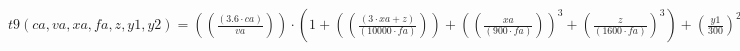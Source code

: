 \documentclass[preview,border=1pt]{standalone}
\begin{document}
$
t9 (ca,va,xa,fa,z,y1,y2) = \left(\left(\frac{\left(\num{3.6}\cdot ca\right)}{va}\right)\right)\cdot \left(\num{1}+\left(\left(\frac{\left(\num{3}\cdot xa+z\right)}{\left(\num{10000}\cdot fa\right)}\right)\right)+\left(\left(\frac{xa}{\left(\num{900}\cdot fa\right)}\right)\right)^{\num{3}}+\left(\frac{z}{\left(\num{1600}\cdot fa\right)}\right)^{\num{3}}\right)+\left(\frac{y1}{\num{300}}\right)^{\num{2}}+\left(\frac{y2}{\num{300}}\right)^{\num{2}}
$
\end{document}
